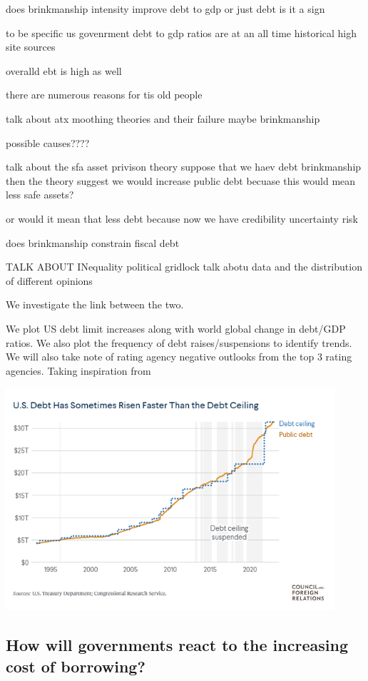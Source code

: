 \documentclass[
  12pt]{article}
\begin{document}
does brinkmanship intensity improve debt to gdp or just debt is it a
sign

to be specific us govenrment debt to gdp ratios are at an all time
historical high site sources

overalld ebt is high as well

there are numerous reasons for tis old people

talk about atx moothing theories and their failure maybe brinkmanship

possible causes????

talk about the sfa asset privison theory suppose that we haev debt
brinkmanship then the theory suggest we would increase public debt
becuase this would mean less safe assets?

or would it mean that less debt because now we have credibility
uncertainty risk

does brinkmanship constrain fiscal debt

TALK ABOUT INequality political gridlock talk abotu data and the
distribution of different opinions

We investigate the link between the two.

We plot US debt limit increases along with world global change in
debt/GDP ratios. We also plot the frequency of debt raises/suspensions
to identify trends. We will also take note of rating agency negative
outlooks from the top 3 rating agencies. Taking inspiration from

\includegraphics[width=4.8125in,height=\textheight]{style-guide/Debt plot.png}

\hypertarget{how-will-governments-react-to-the-increasing-cost-of-borrowing}{%
\subsection{How will governments react to the increasing cost of
borrowing?}\label{how-will-governments-react-to-the-increasing-cost-of-borrowing}}
\end{document}
